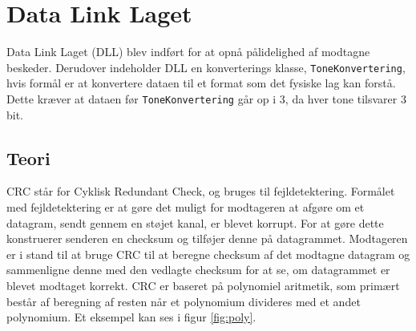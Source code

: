 \section{Data Link Laget}
Data Link Laget (DLL) blev indført for at opnå pålidelighed af modtagne beskeder. Derudover indeholder DLL en konverterings klasse, \texttt{ToneKonvertering}, hvis formål er at konvertere dataen til et format som det fysiske lag kan forstå. Dette kræver at dataen før \texttt{ToneKonvertering} går op i 3, da hver tone tilsvarer 3 bit.

\subsection{Teori}
CRC står for Cyklisk Redundant Check, og bruges til fejldetektering. Formålet med fejldetektering er at gøre det muligt for modtageren at afgøre om et datagram, sendt gennem en støjet kanal, er blevet korrupt. For at gøre dette konstruerer senderen en checksum og tilføjer denne på datagrammet.
\newline
Modtageren er i stand til at bruge CRC til at beregne checksum af det modtagne datagram og sammenligne denne med den vedlagte checksum for at se, om datagrammet er blevet modtaget korrekt.
\newline
CRC er baseret på polynomiel aritmetik, som primært består af beregning af resten når et polynomium divideres med et andet polynomium. Et eksempel kan ses i figur \ref{fig:poly}.
